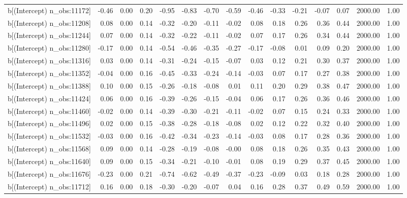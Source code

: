 \begin{table}[ht]
\begin{tabular}{rrrrrrrrrrrrrrr}
  b[(Intercept) n\_obs:11172] & -0.46 & 0.00 & 0.20 & -0.95 & -0.83 & -0.70 & -0.59 & -0.46 & -0.33 & -0.21 & -0.07 & 0.07 & 2000.00 & 1.00 \\ 
  b[(Intercept) n\_obs:11208] & 0.08 & 0.00 & 0.14 & -0.32 & -0.20 & -0.11 & -0.02 & 0.08 & 0.18 & 0.26 & 0.36 & 0.44 & 2000.00 & 1.00 \\ 
  b[(Intercept) n\_obs:11244] & 0.07 & 0.00 & 0.14 & -0.32 & -0.22 & -0.11 & -0.02 & 0.07 & 0.17 & 0.26 & 0.34 & 0.44 & 2000.00 & 1.00 \\ 
  b[(Intercept) n\_obs:11280] & -0.17 & 0.00 & 0.14 & -0.54 & -0.46 & -0.35 & -0.27 & -0.17 & -0.08 & 0.01 & 0.09 & 0.20 & 2000.00 & 1.00 \\ 
  b[(Intercept) n\_obs:11316] & 0.03 & 0.00 & 0.14 & -0.31 & -0.24 & -0.15 & -0.07 & 0.03 & 0.12 & 0.21 & 0.30 & 0.37 & 2000.00 & 1.00 \\ 
  b[(Intercept) n\_obs:11352] & -0.04 & 0.00 & 0.16 & -0.45 & -0.33 & -0.24 & -0.14 & -0.03 & 0.07 & 0.17 & 0.27 & 0.38 & 2000.00 & 1.00 \\ 
  b[(Intercept) n\_obs:11388] & 0.10 & 0.00 & 0.15 & -0.26 & -0.18 & -0.08 & 0.01 & 0.11 & 0.20 & 0.29 & 0.38 & 0.47 & 2000.00 & 1.00 \\ 
  b[(Intercept) n\_obs:11424] & 0.06 & 0.00 & 0.16 & -0.39 & -0.26 & -0.15 & -0.04 & 0.06 & 0.17 & 0.26 & 0.36 & 0.46 & 2000.00 & 1.00 \\ 
  b[(Intercept) n\_obs:11460] & -0.02 & 0.00 & 0.14 & -0.39 & -0.30 & -0.21 & -0.11 & -0.02 & 0.07 & 0.15 & 0.24 & 0.33 & 2000.00 & 1.00 \\ 
  b[(Intercept) n\_obs:11496] & 0.02 & 0.00 & 0.15 & -0.38 & -0.28 & -0.18 & -0.08 & 0.02 & 0.12 & 0.22 & 0.32 & 0.40 & 2000.00 & 1.00 \\ 
  b[(Intercept) n\_obs:11532] & -0.03 & 0.00 & 0.16 & -0.42 & -0.34 & -0.23 & -0.14 & -0.03 & 0.08 & 0.17 & 0.28 & 0.36 & 2000.00 & 1.00 \\ 
  b[(Intercept) n\_obs:11568] & 0.09 & 0.00 & 0.14 & -0.28 & -0.19 & -0.08 & -0.00 & 0.08 & 0.18 & 0.26 & 0.35 & 0.43 & 2000.00 & 1.00 \\ 
  b[(Intercept) n\_obs:11640] & 0.09 & 0.00 & 0.15 & -0.34 & -0.21 & -0.10 & -0.01 & 0.08 & 0.19 & 0.29 & 0.37 & 0.45 & 2000.00 & 1.00 \\ 
  b[(Intercept) n\_obs:11676] & -0.23 & 0.00 & 0.21 & -0.74 & -0.62 & -0.49 & -0.37 & -0.23 & -0.09 & 0.03 & 0.18 & 0.28 & 2000.00 & 1.00 \\ 
  b[(Intercept) n\_obs:11712] & 0.16 & 0.00 & 0.18 & -0.30 & -0.20 & -0.07 & 0.04 & 0.16 & 0.28 & 0.37 & 0.49 & 0.59 & 2000.00 & 1.00 \\ 

\end{tabular}
\end{table}
